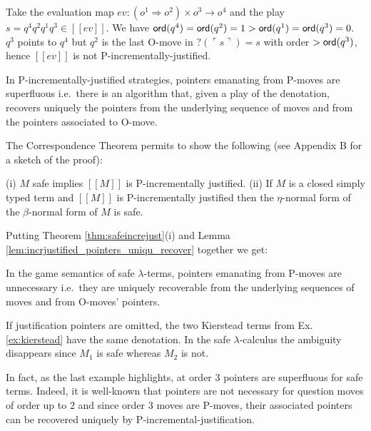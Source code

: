 \documentclass{llncs}
\newcommand\ord[1]{{\sf ord}(#1)}
\newcommand{\sem}[1]{{[\![ #1 ]\!]}}
\newcommand{\pview}[1]{\ulcorner #1 \urcorner}
\begin{document}
\begin{example}
Take the evaluation map $ev : (o^1 \Rightarrow o^2) \times  o^3 \rightarrow o^4$ and
the play $s = q^4 q^2 q^1 q^3 \in \sem{ev}$. We have $\ord{q^4} = \ord{q^2} = 1 > \ord{q^1} = \ord{q^3} = 0$.
$q^3$ points to $q^4$ but $q^2$ is the last O-move in $?(\pview{s})= s$
with order $>\ord{q^3}$, hence $\sem{ev}$ is not P-incrementally-justified.
\end{example}

\begin{lemma}
\label{lem:incrjustified_pointers_uniqu_recover} In P-incrementally-justified strategies, pointers emanating from P-moves are superfluous i.e.\ 
there is an algorithm that, given a play of the denotation, recovers uniquely the pointers from the underlying sequence of moves and from the pointers associated to O-move.
\end{lemma}


The Correspondence Theorem permits to show the following (see Appendix B for a sketch of the proof):

\begin{theorem}
\label{thm:safeincrejust}
(i) $M$ safe implies $\sem{M}$ is P-incrementally justified.
(ii) If $M$ is a closed simply typed term and $\sem{M}$ is P-incrementally justified then the $\eta$-normal form of the $\beta$-normal form  of $M$ is safe.
\end{theorem}



Putting Theorem \ref{thm:safeincrejust}(i)
and Lemma \ref{lem:incrjustified_pointers_uniqu_recover} together
we get:
\begin{proposition}
\label{prop:safe_ptr_recoverable} In the game semantics of
safe $\lambda$-terms, pointers emanating from P-moves are
unnecessary i.e.\ they are uniquely recoverable from the underlying sequences of moves and from O-moves' pointers.
\end{proposition}

\begin{example} If justification pointers are omitted, the two Kierstead terms from Ex. \ref{ex:kierstead} have
the same denotation. In the safe $\lambda$-calculus the ambiguity disappears since $M_1$ is safe whereas $M_2$ is not.
\end{example}

In fact, as the last example highlights, at order $3$ pointers are superfluous for safe terms. Indeed, it is well-known that  pointers are not necessary for question moves of order up to $2$ and since order $3$ moves are P-moves, their associated pointers can be recovered uniquely by P-incremental-justification.
\end{document}
